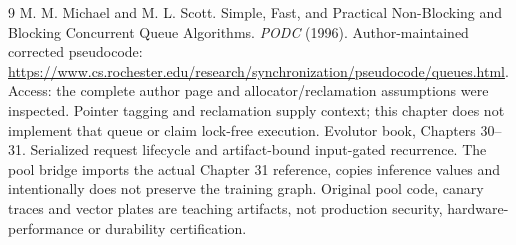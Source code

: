 \begin{thebibliography}{9}
 M. M. Michael and M. L. Scott.
Simple, Fast, and Practical Non-Blocking and Blocking Concurrent Queue Algorithms.
\emph{PODC} (1996). Author-maintained corrected pseudocode:
\url{https://www.cs.rochester.edu/research/synchronization/pseudocode/queues.html}.
Access: the complete author page and allocator/reclamation assumptions were inspected.
Pointer tagging and reclamation supply context; this chapter does not implement
that queue or claim lock-free execution.
 Evolutor book, Chapters 30--31.
Serialized request lifecycle and artifact-bound input-gated recurrence.
The pool bridge imports the actual Chapter 31 reference, copies inference values
and intentionally does not preserve the training graph.
Original pool code, canary traces and vector plates are teaching artifacts,
not production security, hardware-performance or durability certification.
\end{thebibliography}
